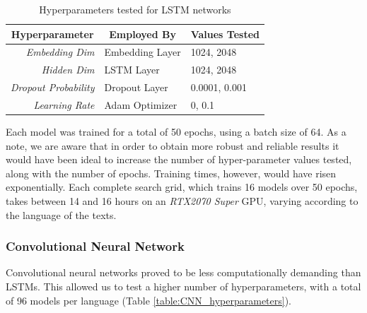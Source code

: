 \documentclass[letterpaper,11pt]{article}
\begin{document}
\begin{table}[H]
  \centering
  \begin{tabular}{@{}rll@{}}
  \toprule
  \multicolumn{1}{c}{\textbf{Hyperparameter}} & \multicolumn{1}{c}{\textbf{Employed By}} & \textbf{Values Tested} \\ \midrule
  \textit{Embedding Dim}                               & Embedding Layer                          & 1024, 2048             \\
  \textit{Hidden Dim}                                  & LSTM Layer                               & 1024, 2048             \\
  \textit{Dropout Probability}                         & Dropout Layer                            & 0.0001, 0.001          \\
  \textit{Learning Rate}                               & Adam Optimizer                           & 0, 0.1                 \\ \bottomrule
\end{tabular}
\caption{Hyperparameters tested for LSTM networks}
\label{table:LSTM_hyperparameters}
\end{table}

Each model was trained for a total of 50 epochs, using a batch size of 64. As a note, we are aware that in order to obtain more robust and reliable results it would have been ideal to increase the number of hyper-parameter values tested, along with the number of epochs. Training times, however, would have risen exponentially. Each complete search grid, which trains 16 models over 50 epochs, takes between 14 and 16 hours on an \textit{RTX2070 Super} GPU, varying according to the language of the texts.

\subsubsection*{Convolutional Neural Network}

Convolutional neural networks proved to be less computationally demanding than LSTMs. This allowed us to test a higher number of hyperparameters, with a total of 96 models per language (Table \ref{table:CNN_hyperparameters}).
\end{document}

